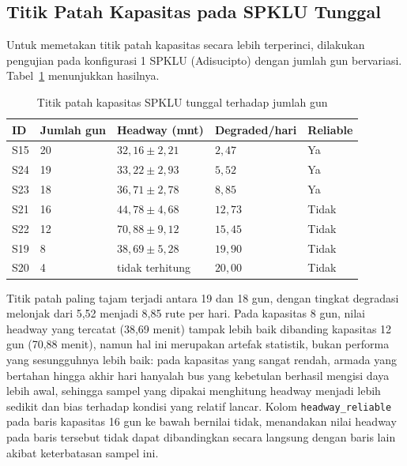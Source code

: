 \subsection{Titik Patah Kapasitas pada SPKLU Tunggal}

Untuk memetakan titik patah kapasitas secara lebih terperinci, dilakukan
pengujian pada konfigurasi 1 SPKLU (Adisucipto) dengan jumlah gun
bervariasi. Tabel~\ref{tab:regime-shift} menunjukkan hasilnya.

\begin{table}[h]
	\centering
	\caption{Titik patah kapasitas SPKLU tunggal terhadap jumlah gun}
	\label{tab:regime-shift}
	\begin{tabular}{|l|l|l|l|l|}
		\hline
		\textbf{ID} & \textbf{Jumlah gun} & \textbf{Headway (mnt)} & \textbf{Degraded/hari} & \textbf{Reliable} \\
		\hline
		S15 & 20 & $32{,}16 \pm 2{,}21$ & $2{,}47$ & Ya \\ \hline
		S24 & 19 & $33{,}22 \pm 2{,}93$ & $5{,}52$ & Ya \\ \hline
		S23 & 18 & $36{,}71 \pm 2{,}78$ & $8{,}85$ & Ya \\ \hline
		S21 & 16 & $44{,}78 \pm 4{,}68$ & $12{,}73$ & Tidak \\ \hline
		S22 & 12 & $70{,}88 \pm 9{,}12$ & $15{,}45$ & Tidak \\ \hline
		S19 & 8 & $38{,}69 \pm 5{,}28$ & $19{,}90$ & Tidak \\ \hline
		S20 & 4 & tidak terhitung & $20{,}00$ & Tidak \\ \hline
	\end{tabular}
\end{table}

Titik patah paling tajam terjadi antara 19 dan 18 gun, dengan tingkat
degradasi melonjak dari 5,52 menjadi 8,85 rute per hari. Pada kapasitas
8 gun, nilai headway yang tercatat (38,69 menit) tampak lebih baik
dibanding kapasitas 12 gun (70,88 menit), namun hal ini merupakan
artefak statistik, bukan performa yang sesungguhnya lebih baik: pada
kapasitas yang sangat rendah, armada yang bertahan hingga akhir hari
hanyalah bus yang kebetulan berhasil mengisi daya lebih awal, sehingga
sampel yang dipakai menghitung headway menjadi lebih sedikit dan bias
terhadap kondisi yang relatif lancar. Kolom \texttt{headway\_reliable}
pada baris kapasitas 16 gun ke bawah bernilai tidak, menandakan nilai
headway pada baris tersebut tidak dapat dibandingkan secara langsung
dengan baris lain akibat keterbatasan sampel ini.


